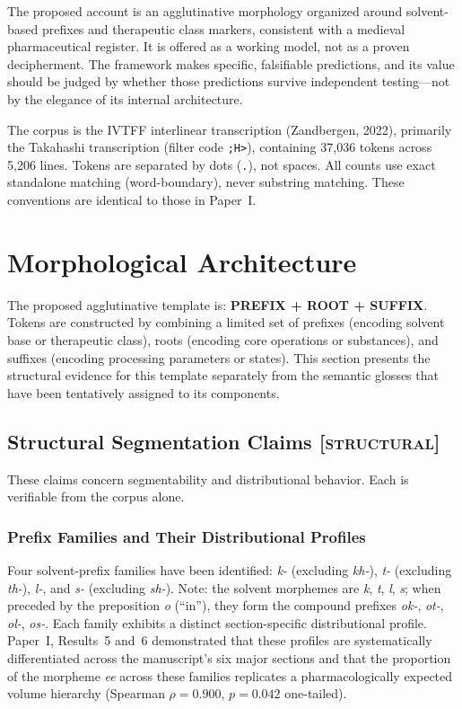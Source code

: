 \documentclass[11pt,a4paper]{article}
\newcommand{\structural}{\textsc{[structural]}}
\begin{document}
The proposed account is an agglutinative morphology organized around solvent-based prefixes and therapeutic class markers, consistent with a medieval pharmaceutical register. It is offered as a working model, not as a proven decipherment. The framework makes specific, falsifiable predictions, and its value should be judged by whether those predictions survive independent testing---not by the elegance of its internal architecture.

The corpus is the IVTFF interlinear transcription (Zandbergen, 2022), primarily the Takahashi transcription (filter code \texttt{;H>}), containing 37,036 tokens across 5,206 lines. Tokens are separated by dots (\texttt{.}), not spaces. All counts use exact standalone matching (word-boundary), never substring matching. These conventions are identical to those in Paper~I.

\section{Morphological Architecture}

The proposed agglutinative template is: \textbf{PREFIX + ROOT + SUFFIX}. Tokens are constructed by combining a limited set of prefixes (encoding solvent base or therapeutic class), roots (encoding core operations or substances), and suffixes (encoding processing parameters or states). This section presents the structural evidence for this template separately from the semantic glosses that have been tentatively assigned to its components.

\subsection{Structural Segmentation Claims \structural{}}

These claims concern segmentability and distributional behavior. Each is verifiable from the corpus alone.

\subsubsection{Prefix Families and Their Distributional Profiles}

Four solvent-prefix families have been identified: \textit{k-} (excluding \textit{kh-}), \textit{t-} (excluding \textit{th-}), \textit{l-}, and \textit{s-} (excluding \textit{sh-}). Note: the solvent morphemes are \textit{k}, \textit{t}, \textit{l}, \textit{s}; when preceded by the preposition \textit{o} (``in''), they form the compound prefixes \textit{ok-}, \textit{ot-}, \textit{ol-}, \textit{os-}. Each family exhibits a distinct section-specific distributional profile. Paper~I, Results~5 and~6 demonstrated that these profiles are systematically differentiated across the manuscript's six major sections and that the proportion of the morpheme \textit{ee} across these families replicates a pharmacologically expected volume hierarchy (Spearman $\rho = 0.900$, $p = 0.042$ one-tailed).
\end{document}

